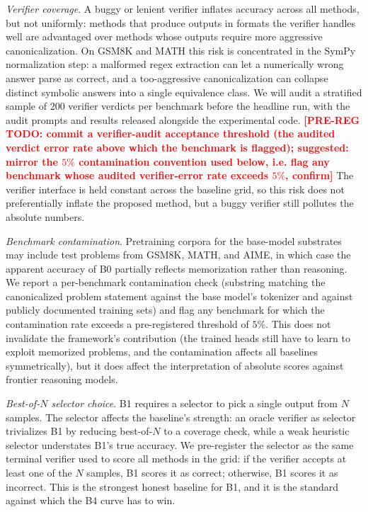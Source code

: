 \textit{Verifier coverage}. A buggy or lenient verifier inflates
accuracy across all methods, but not uniformly: methods that produce
outputs in formats the verifier handles well are advantaged over
methods whose outputs require more aggressive canonicalization. On
GSM8K and MATH this risk is concentrated in the SymPy normalization
step: a malformed regex extraction can let a numerically wrong answer
parse as correct, and a too-aggressive canonicalization can collapse
distinct symbolic answers into a single equivalence class. We will
audit a stratified sample of $200$ verifier verdicts per benchmark
before the headline run, with the audit prompts and results released
alongside the experimental code.
\textcolor{red}{\textbf{[PRE-REG TODO: commit a verifier-audit
acceptance threshold (the audited verdict error rate above which the
benchmark is flagged); suggested: mirror the $5\%$ contamination
convention used below, i.e. flag any benchmark whose audited
verifier-error rate exceeds $5\%$, confirm]}}
The verifier interface is held
constant across the baseline grid, so this risk does not preferentially
inflate the proposed method, but a buggy verifier still pollutes the
absolute numbers.

\textit{Benchmark contamination}. Pretraining corpora for the
base-model substrates may include test problems from GSM8K, MATH, and
AIME, in which case the apparent accuracy of B0 partially reflects
memorization rather than reasoning. We report a per-benchmark
contamination check (substring matching the canonicalized problem
statement against the base model's tokenizer and against publicly
documented training sets) and flag any benchmark for which the
contamination rate exceeds a pre-registered threshold of $5\%$. This
does not invalidate the framework's contribution (the trained heads
still have to learn to exploit memorized problems, and the
contamination affects all baselines symmetrically), but it does affect
the interpretation of absolute scores against frontier reasoning models.

\textit{Best-of-$N$ selector choice}. B1 requires a selector to pick a
single output from $N$ samples. The selector affects the baseline's
strength: an oracle verifier as selector trivializes B1 by reducing
best-of-$N$ to a coverage check, while a weak heuristic selector
understates B1's true accuracy. We pre-register the selector as the
same terminal verifier used to score all methods in the grid: if the
verifier accepts at least one of the $N$ samples, B1 scores it as
correct; otherwise, B1 scores it as incorrect. This is the strongest
honest baseline for B1, and it is the standard against which the B4
curve has to win.

